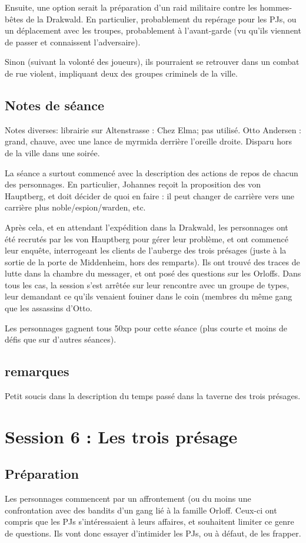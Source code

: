 \documentclass[10pt,a4paper]{book}
\begin{document}
Ensuite, une option serait la préparation d'un raid militaire contre les hommes-bêtes de la Drakwald. En particulier, probablement du repérage pour les PJs, ou un déplacement avec les troupes, probablement à l'avant-garde (vu qu'ils viennent de passer et connaissent l'adversaire).

Sinon (suivant la volonté des joueurs), ils pourraient se retrouver dans un combat de rue violent, impliquant deux des groupes criminels de la ville.
\subsection{Notes de séance}
Notes diverses: librairie sur Altenstrasse : Chez Elma; pas utilisé. Otto Andersen : grand, chauve, avec une lance de myrmida derrière l'oreille droite. Disparu hors de la ville dans une soirée.

La séance a surtout commencé avec la description des actions de repos de chacun des personnages. En particulier, Johannes reçoit la proposition des von Hauptberg, et doit décider de quoi en faire : il peut changer de carrière vers une carrière plus noble/espion/warden, etc. 

Après cela, et en attendant l'expédition dans la Drakwald, les personnages ont été recrutés par les von Hauptberg pour gérer leur problème, et ont commencé leur enquête, interrogeant les clients de l'auberge des trois présages (juste à la sortie de la porte de Middenheim, hors des remparts). Ils ont trouvé des traces de lutte dans la chambre du messager, et ont posé des questions sur les Orloffs. Dans tous les cas, la session s'est arrêtée sur leur rencontre avec un groupe de types, leur demandant ce qu'ils venaient fouiner dans le coin (membres du même gang que les assassins d'Otto.

Les personnages gagnent tous 50xp pour cette séance (plus courte et moins de défis que sur d'autres séances).
\subsection{remarques}
Petit soucis dans la description du temps passé dans la taverne des trois présages.
\section{Session 6 : Les trois présage}
\subsection{Préparation}
Les personnages commencent par un affrontement (ou du moins une confrontation avec des bandits d'un gang lié à la famille Orloff. Ceux-ci ont compris que les PJs s'intéressaient à leurs affaires, et souhaitent limiter ce genre de questions. Ils vont donc essayer d'intimider les PJs, ou à défaut, de les frapper.
\end{document}
